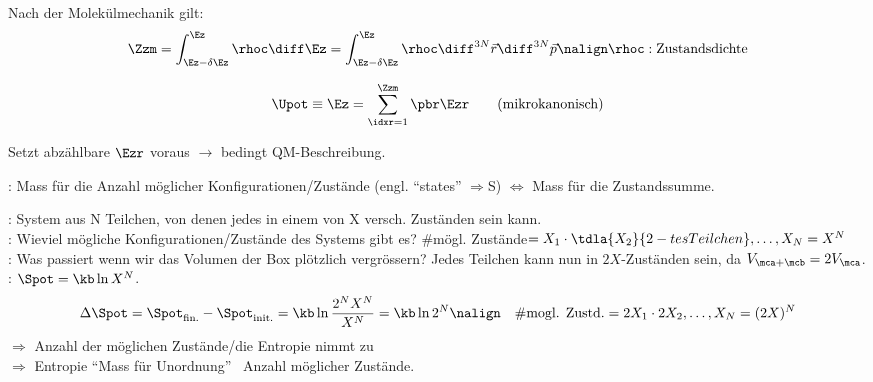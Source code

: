 \begin{emphbox}\nospacing
  \begin{law}
    Nach der Molekülmechanik gilt:
    \begin{align}
      \Zzm=\int_{\Ez-\delta\Ez}^{\Ez}\rhoc\diff\Ez=\int_{\Ez-\delta\Ez}^{\Ez}\rhoc\diff^{3N}\vec{r}\diff^{3N}\vec{p}\nalign
      \rhoc:\text{Zustandsdichte} \nonumber
    \end{align}
  \end{law}
\end{emphbox}
\begin{sectionbox}\nospacing
  \begin{numberlist}
  \item \begin{equation}
		\Upot\equiv\Ez=\sum_{\idxr=1}^{\Zzm}\pbr\Ezr\qquad(\text{mikrokanonisch})
  \end{equation}
  \begin{notebox}[Bemerkung]
    Setzt abzählbare $\Ezr$ voraus $\rightarrow$ bedingt QM-Beschreibung.
  \end{notebox}
    \item {}: Mass für die Anzahl möglicher Konfigurationen/Zustände (engl. ``states''
  $\Rightarrow$S) $\Leftrightarrow$ Mass für die Zustandssumme.
  \end{numberlist}
\end{sectionbox}
\begin{notebox}[Beispiel]\nospacing
  : System aus N Teilchen, von denen jedes in einem von X versch. Zuständen sein kann.\\
  : Wieviel mögliche Konfigurationen/Zustände des Systems gibt es? \#mögl. Zustände$=X_1\cdot\tdla{X_2}{\normalfont{2-tes Teilchen}},\ldots,X_N=X^N$\\
  : Was passiert wenn wir das Volumen der Box plötzlich vergrössern?
  Jedes Teilchen kann nun in $2X$-Zuständen sein, da $V_{\mca+\mcb}=2V_{\mca}$. \\
  : \hfil$\Spot=\kb\ln X^N$.
  \begin{align*}
    &\Delta\Spot=\Spot_{\text{fin.}}-\Spot_{\text{init.}}=\kb\ln\frac{2^N X^N}{X^N}=\kb\ln2^N \nalign
    &\#\text{mogl. Zustd.}=2X_1\cdot 2X_2,\ldots,X_N=(2X)^N
  \end{align*}
  $\Rightarrow$ Anzahl der möglichen Zustände/die Entropie nimmt zu\\
  $\Rightarrow$ Entropie ``Mass für Unordnung''~ Anzahl möglicher Zustände.
\end{notebox}
